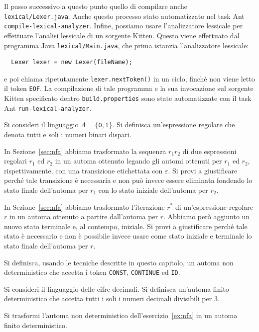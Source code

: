 Il passo successivo \e a questo punto quello di compilare
anche \texttt{lexical/Lexer.java}.
Anche questo processo \e stato automatizzato nel task Ant
\texttt{compile-lexical-analyzer}. Infine, possiamo usare l'analizzatore lessicale
per effettuare l'analisi lessicale di un sorgente Kitten.
Questo viene effettuato dal programma Java \texttt{lexical/Main.java},
che prima istanzia l'analizzatore lessicale:
%
\begin{verbatim}
  Lexer lexer = new Lexer(fileName);
\end{verbatim}
%
e poi chiama ripetutamente \texttt{lexer.nextToken()} in un ciclo, finch\'e non viene letto
il token \texttt{EOF}. La compilazione di tale programma e la sua invocazione sul sorgente Kitten
specificato dentro \verb|build.properties| sono state automatizzate con il task Ant
\texttt{run-lexical-analyzer}.
%
\begin{exercise}\label{ex:regular_odd}
Si consideri il linguaggio $\Lambda=\{\mathtt{0},\mathtt{1}\}$.
Si definisca un'espressione regolare che denota tutti e soli i numeri binari
dispari.
\end{exercise}
%
\begin{exercise}\label{ex:r1r2}
In Sezione~\ref{sec:nfa} abbiamo trasformato la sequenza $r_1r_2$ di
due espressioni regolari $r_1$ ed $r_2$ in un automa ottenuto
legando gli automi ottenuti per $r_1$ ed $r_2$, rispettivamente,
con una transizione etichettata con $\varepsilon$. Si provi
a giustificare perch\'e tale transizione \`e necessaria e non
pu\`o invece essere eliminata fondendo lo stato finale
dell'automa per $r_1$ con lo stato iniziale dell'automa per $r_2$.
\end{exercise}
%
\begin{exercise}\label{ex:rstar}
In Sezione~\ref{sec:nfa} abbiamo trasformato l'iterazione $r^*$ di
un'espressione regolare $r$ in un automa ottenuto a partire dall'automa
per $r$. Abbiamo per\`o aggiunto un nuovo stato terminale e, al contempo,
iniziale. Si provi a giustificare perch\'e tale stato \`e necessario e non
\`e possibile invece usare come stato iniziale e terminale
lo stato finale dell'automa per $r$.
\end{exercise}
%
\begin{exercise}\label{ex:nfa}
Si definisca, usando le tecniche descritte in questo capitolo,
un automa non deterministico che accetta i token
\texttt{CONST}, \texttt{CONTINUE} ed \texttt{ID}.
\end{exercise}
%
\begin{exercise}\label{ex:dfa_three}
Si consideri il linguaggio delle cifre decimali. Si definisca un'automa finito
deterministico che accetta tutti i soli i numeri decimali divisibili per $3$.
\end{exercise}
%
\begin{exercise}\label{ex:nfatodfa}
Si trasformi l'automa non deterministico dell'esercizio~\ref{ex:nfa}
in un automa finito deterministico.
\end{exercise}
